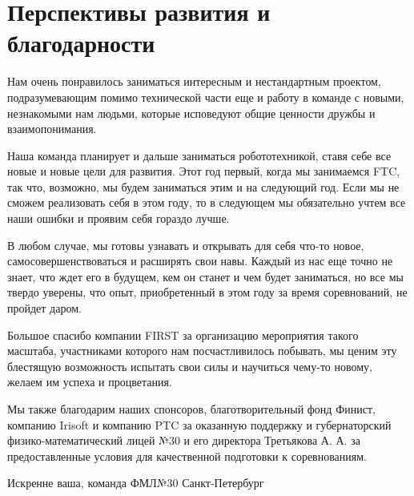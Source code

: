 
\section{Перспективы развития и благодарности}
    Нам очень понравилось заниматься интересным и нестандартным проектом, подразумевающим помимо технической части еще и работу в команде с новыми, незнакомыми нам людьми, которые исповедуют общие ценности дружбы и взаимопонимания.
    
    Наша команда планирует и дальше заниматься робототехникой, ставя себе все новые и новые цели для развития. Этот год первый, когда мы занимаемся FTC, так что, возможно, мы будем заниматься этим и на следующий год. Если мы не сможем реализовать себя в этом году, то в следующем мы обязательно учтем все наши ошибки и проявим себя гораздо лучше.
    
    В любом случае, мы готовы узнавать и открывать для себя что-то новое, самосовершенствоваться и расширять свои навы.
     Каждый из нас еще точно не знает, что ждет его в будущем, кем он станет и чем будет заниматься, но все мы твердо уверены, что опыт, приобретенный в этом году за время соревнований, не пройдет даром.
    
    Большое спасибо компании FIRST за организацию мероприятия такого масштаба, участниками которого нам посчастливилось побывать, мы ценим эту блестящую возможность испытать свои силы и научиться чему-то новому, желаем им успеха и процветания.
    
    Мы также благодарим наших спонсоров, благотворительный фонд Финист, компанию Irisoft и компанию PTC за оказанную поддержку и губернаторский физико-математический лицей №30 и его директора Третьякова А. А. за предоставленные условия для качественной подготовки к соревнованиям.
    
    \begin{center}
      Искренне ваша, команда ФМЛ№30 Санкт-Петербург
    \end{center}
    
    \vspace{0.5em}
    
